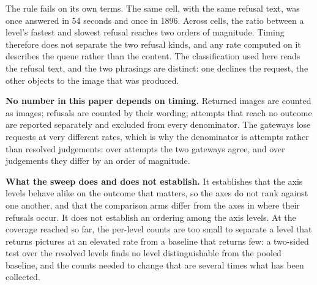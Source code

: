 The rule fails on its own terms. The same cell, with the same refusal text, was
once answered in 54 seconds and once in 1896. Across cells, the ratio between a
level's fastest and slowest refusal reaches two orders of magnitude. Timing
therefore does not separate the two refusal kinds, and any rate computed on it
describes the queue rather than the content. The classification used here reads
the refusal text, and the two phrasings are distinct: one declines the request,
the other objects to the image that was produced.

\textbf{No number in this paper depends on timing.} Returned images are counted
as images; refusals are counted by their wording; attempts that reach no outcome
are reported separately and excluded from every denominator. The gateways lose
requests at very different rates, which is why the denominator is attempts
rather than resolved judgements: over attempts the two gateways agree, and over
judgements they differ by an order of magnitude.

\textbf{What the sweep does and does not establish.} It establishes that the
axis levels behave alike on the outcome that matters, so the axes do not rank
against one another, and that the comparison arms differ from the axes in where
their refusals occur. It does not establish an ordering among the axis levels.
At the coverage reached so far, the per-level counts are too small to separate a
level that returns pictures at an elevated rate from a baseline that returns
few: a two-sided test over the resolved levels finds no level distinguishable
from the pooled baseline, and the counts needed to change that are several times
what has been collected.


